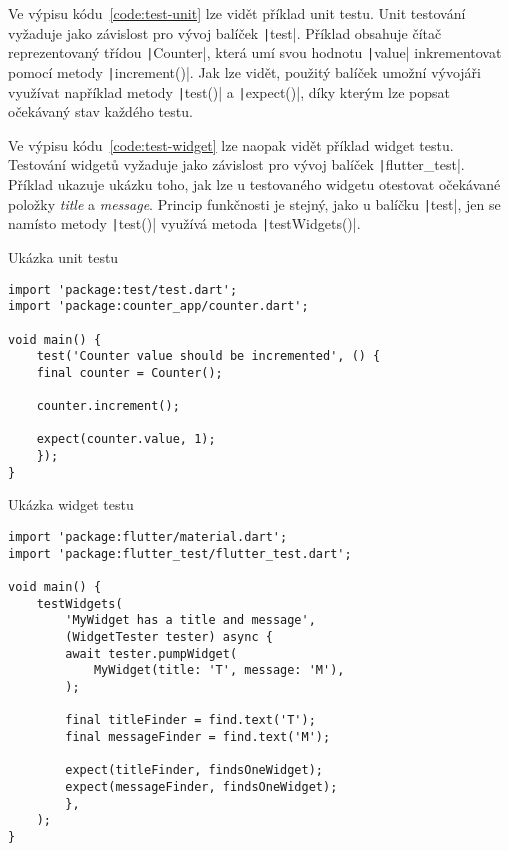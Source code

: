 Ve výpisu kódu~\ref{code:test-unit} lze vidět příklad unit testu.
Unit testování vyžaduje jako závislost pro vývoj balíček
\texttt|test|.
Příklad obsahuje čítač reprezentovaný třídou \texttt|Counter|,
která umí svou hodnotu \texttt|value| inkrementovat pomocí
metody \texttt|increment()|.
Jak lze vidět,
použitý balíček umožní vývojáři využívat například metody
\texttt|test()| a \texttt|expect()|,
díky kterým lze popsat očekávaný stav každého testu.~\cite{testing_flutter_unit}

Ve výpisu kódu~\ref{code:test-widget} lze naopak vidět příklad widget testu.
Testování widgetů vyžaduje jako závislost pro vývoj balíček
\texttt|flutter_test|.
Příklad ukazuje ukázku toho,
jak lze u testovaného widgetu otestovat očekávané položky \emph{title}
a \emph{message}.
Princip funkčnosti je stejný,
jako u balíčku \texttt|test|,
jen se namísto metody \texttt|test()|
využívá metoda \texttt|testWidgets()|.~\cite{testing_flutter_widget}

\begin{listing}
    \caption{Ukázka unit testu~\cite{testing_flutter_unit}}
    \label{code:test-unit}
    \begin{verbatim}
import 'package:test/test.dart';
import 'package:counter_app/counter.dart';

void main() {
    test('Counter value should be incremented', () {
    final counter = Counter();

    counter.increment();

    expect(counter.value, 1);
    });
}
    \end{verbatim}
\end{listing}

\begin{listing}
    \caption{Ukázka widget testu~\cite{testing_flutter_widget}}
    \label{code:test-widget}
    \begin{verbatim}
import 'package:flutter/material.dart';
import 'package:flutter_test/flutter_test.dart';

void main() {
    testWidgets(
        'MyWidget has a title and message',
        (WidgetTester tester) async {
        await tester.pumpWidget(
            MyWidget(title: 'T', message: 'M'),
        );

        final titleFinder = find.text('T');
        final messageFinder = find.text('M');

        expect(titleFinder, findsOneWidget);
        expect(messageFinder, findsOneWidget);
        },
    );
}
    \end{verbatim}
\end{listing}

